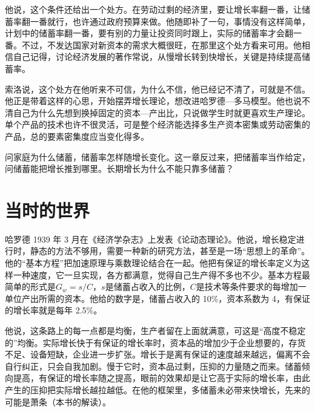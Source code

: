 他说，这个条件还给出一个处方。在劳动过剩的经济里，要让增长率翻一番，让储蓄率翻一番就行，也许通过政府预算来做\cite{solow1987}。他随即补了一句，事情没有这样简单，计划中的储蓄率翻一番，要有别的力量让投资同时跟上，实际的储蓄率才会翻一番\cite{solow1987}。不过，不发达国家对新资本的需求大概很旺，在那里这个处方看来可用\cite{solow1987}。他相信自己记得，讨论经济发展的著作常说，从慢增长转到快增长，关键是持续提高储蓄率\cite{solow1987}。

索洛说，这个处方在他听来不可信，为什么不信，他已经记不清了，可就是不信\cite{solow1987}。他正是带着这样的心思，开始摆弄增长理论，想改进哈罗德—多马模型\cite{solow1987}。他也说不清自己为什么先想到换掉固定的资本—产出比，只说做学生时就更喜欢生产理论\cite{solow1987}。单个产品的技术也许不很灵活，可是整个经济能选择多生产资本密集或劳动密集的产品，总的要素密集度应当变化得多\cite{solow1987}。

问家庭为什么储蓄，储蓄率怎样随增长变化。这一章反过来，把储蓄率当作给定，问储蓄能把增长推到哪里。长期增长为什么不能只靠多储蓄？

\section{当时的世界}\label{sec:solow-world}

哈罗德 1939 年 3 月在《经济学杂志》上发表《论动态理论》\cite{harrod1939}。他说，增长稳定进行时，静态的方法不够用，需要一种新的研究方法，甚至是一场“思想上的革命”\cite{harrod1939}。他的“基本方程”把加速原理与乘数理论结合在一起\cite{harrod1939}。他把有保证的增长率定义为这样一种速度，它一旦实现，各方都满意，觉得自己生产得不多也不少\cite{harrod1939}。基本方程最简单的形式是$G_w=s/C$，$s$是储蓄占收入的比例，$C$是技术等条件要求的每增加一单位产出所需的资本\cite{harrod1939}。他给的数字是，储蓄占收入的 10\%，资本系数为 4，有保证的增长率就是每年 2.5\%\cite{harrod1939}。

他说，这条路上的每一点都是均衡，生产者留在上面就满意，可这是“高度不稳定的”均衡\cite{harrod1939}。实际增长快于有保证的增长率时，资本品的增加少于企业想要的，存货不足、设备短缺，企业进一步扩张\cite{harrod1939}。增长于是离有保证的速度越来越远，偏离不会自行纠正，只会自我加剧\cite{harrod1939}。慢于它时，资本品过剩，压抑的力量随之而来\cite{harrod1939}。储蓄倾向提高，有保证的增长率随之提高，眼前的效果却是让它高于实际的增长率，由此产生的压抑把实际增长越拉越低\cite{harrod1939}。在他的框架里，多储蓄未必带来快增长，先来的可能是萧条（本书的解读）。

